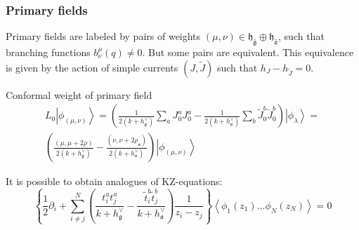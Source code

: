 \documentclass[pdftex]{beamer}
\newcommand{\gf}{\mathfrak{g}}
\newcommand{\gfh}{\hat{\mathfrak{g}}}
\newcommand{\af}{\mathfrak{a}}
\newcommand{\afh}{\hat{\mathfrak{a}}}
\newcommand{\hf}{\mathfrak{h}}
\theoremstyle{definition} \newtheorem{Def}{Definition}
\begin{document}
\begin{frame}
  \frametitle{Primary fields}

  Primary fields are labeled by pairs of weights $(\mu,\nu)\in \hf_{\gfh}\oplus \hf_{\afh}$, such that branching functions $b^{\mu}_{\nu}(q)\neq 0$. But some pairs are equivalent. This equivalence is given by the action of simple currents $(J,\tilde{J})$ such that $h_{J}-h_{\tilde{J}}=0$. 

  Conformal weight of primary field
  \begin{multline}
    L_0\left|\phi_{(\mu,\nu)}\right>=\left(\frac{1}{2(k+h^{\vee}_{\gf})}\sum_aJ^a_0J^a_0-\frac{1}{2(k+h_{\af}^{\vee})}\sum_b \tilde{J}^b_0 \tilde{J}^b_0 \right)
    \left|\phi_{\lambda}\right>=\\
    \left(\frac{(\mu,\mu+2\rho)}{2(k+h^{\vee}_{\gf})}-\frac{(\nu,\nu+2\rho_{\af})}{2(k+h^{\vee}_{\af})}\right)\left|\phi_{(\mu,\nu)}\right>
  \end{multline}


 It is possible to obtain analogues of KZ-equations:
  \begin{equation*}
    \left\{\frac{1}{2}\partial_{i} + \sum_{i\neq j}^{N}\left(\frac{t^{a}_{i}t^{a}_{j}}{k+h^{\vee}_{\gf}}-\frac{\tilde t^{b}_{i}\tilde t^{b}_{j}}{k+h^{\vee}_{\af}}\right)\frac{1}{z_{i}-z_{j}}\right\} \left<\phi_{1}(z_{1})\dots \phi_{N}(z_{N})\right>=0
  \end{equation*}
\end{frame}
\end{document}
